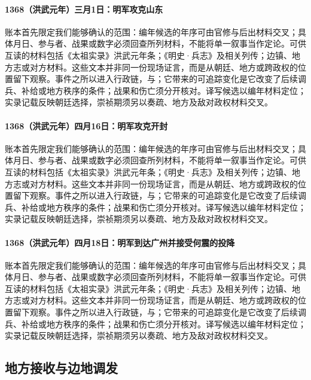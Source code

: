 \paragraph{1368（洪武元年）三月1日：明军攻克山东} 账本首先限定我们能够确认的范围：编年候选的年序可由官修与后出材料交叉；具体月日、参与者、战果或数字必须回查所列材料，不能将单一叙事当作定论。可供互读的材料包括《太祖实录》洪武元年条；《明史·兵志》及相关列传；边镇、地方志或对方材料。这些文本并非同一份现场证言，而是从朝廷、地方或跨政权的位置留下观察。事件之所以进入行政链，与；它带来的可追踪变化是它改变了后续调兵、补给或地方秩序的条件；战果和伤亡须分开核对。译写候选以编年材料定位；实录记载反映朝廷选择，崇祯期须另以奏疏、地方及敌对政权材料交叉。

\paragraph{1368（洪武元年）四月16日：明军攻克开封} 账本首先限定我们能够确认的范围：编年候选的年序可由官修与后出材料交叉；具体月日、参与者、战果或数字必须回查所列材料，不能将单一叙事当作定论。可供互读的材料包括《太祖实录》洪武元年条；《明史·兵志》及相关列传；边镇、地方志或对方材料。这些文本并非同一份现场证言，而是从朝廷、地方或跨政权的位置留下观察。事件之所以进入行政链，与；它带来的可追踪变化是它改变了后续调兵、补给或地方秩序的条件；战果和伤亡须分开核对。译写候选以编年材料定位；实录记载反映朝廷选择，崇祯期须另以奏疏、地方及敌对政权材料交叉。

\paragraph{1368（洪武元年）四月18日：明军到达广州并接受何震的投降} 账本首先限定我们能够确认的范围：编年候选的年序可由官修与后出材料交叉；具体月日、参与者、战果或数字必须回查所列材料，不能将单一叙事当作定论。可供互读的材料包括《太祖实录》洪武元年条；《明史·兵志》及相关列传；边镇、地方志或对方材料。这些文本并非同一份现场证言，而是从朝廷、地方或跨政权的位置留下观察。事件之所以进入行政链，与；它带来的可追踪变化是它改变了后续调兵、补给或地方秩序的条件；战果和伤亡须分开核对。译写候选以编年材料定位；实录记载反映朝廷选择，崇祯期须另以奏疏、地方及敌对政权材料交叉。

\subsection{地方接收与边地调发}

